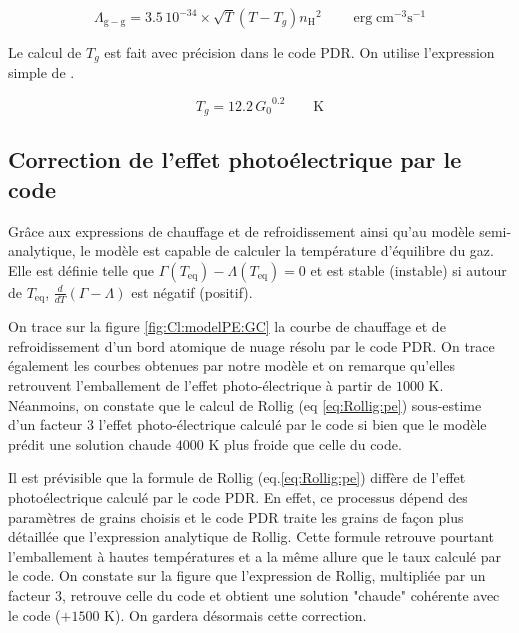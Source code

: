 \begin{equation}
    \Lambda_{\mathrm{g}-\mathrm{g}} = 3.5\,10^{-34}\times \sqrt{T}(T - T_g) {n_\mathrm{H}}^2 \qquad \operatorname{erg} \mathrm{cm}^{-3} \mathrm{s}^{-1}
\end{equation}

Le calcul de $T_g$ est fait avec précision dans le code PDR. On utilise l'expression simple de \cite{Hollenbach1991}. 

\begin{equation}
    T_g = 12.2 \,{G_0}^{0.2} \qquad \mathrm{K}
\end{equation}



\subsection{Correction de l'effet photoélectrique par le code}

Grâce aux expressions de chauffage et de refroidissement ainsi qu'au modèle semi-analytique, le modèle est capable de calculer la température d'équilibre du gaz. Elle est définie telle que $\Gamma(T_{\mathrm{eq}}) - \Lambda(T_{\mathrm{eq}}) = 0$ et est stable (instable) si autour de $T_{\mathrm{eq}}$, $\frac{d}{dT}(\Gamma - \Lambda)$ est négatif (positif). \newline 

On trace sur la figure \ref{fig:Cl:modelPE:GC} la courbe de chauffage et de refroidissement d'un bord atomique de nuage résolu par le code PDR. On trace également les courbes obtenues par notre modèle et on remarque qu'elles retrouvent l'emballement de l'effet photo-électrique à partir de $1000$ K. Néanmoins, on constate que le calcul de Rollig (eq \ref{eq:Rollig:pe}) sous-estime d'un facteur 3 l'effet photo-électrique calculé par le code si bien que le modèle prédit une solution \og chaude \fg{} $4000$ K plus froide que celle du code. \newline 

Il est prévisible que la formule de Rollig (eq.\ref{eq:Rollig:pe}) diffère de l'effet photoélectrique calculé par le code PDR. En effet, ce processus dépend des paramètres de grains choisis et le code PDR traite les grains de façon plus détaillée que l'expression analytique de Rollig. Cette formule retrouve pourtant l'emballement à hautes températures et a la même allure que le taux calculé par le code. On constate sur la figure \label{fig:Cl:modelPE:GC3} que l'expression de Rollig, multipliée par un facteur 3, retrouve celle du code et obtient une solution "chaude" cohérente avec le code ($+1500$ K). On gardera désormais cette correction. 


